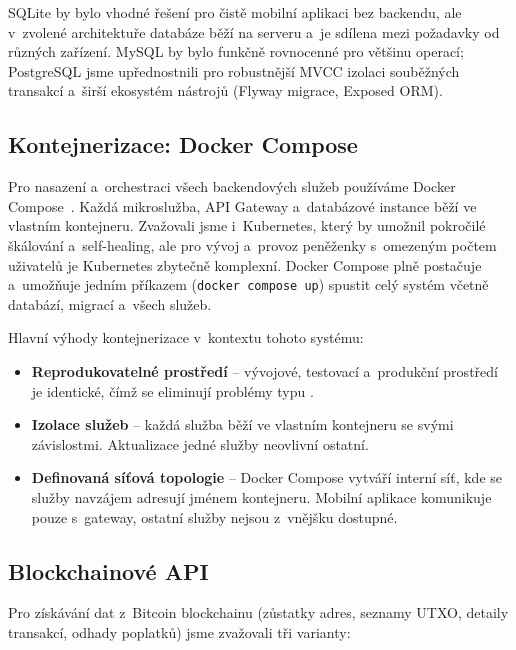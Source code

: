 SQLite by bylo vhodné řešení pro čistě mobilní aplikaci bez backendu, ale
v~zvolené architektuře databáze běží na serveru a~je sdílena mezi požadavky
od různých zařízení. MySQL by bylo funkčně rovnocenné pro většinu operací;
PostgreSQL jsme upřednostnili pro robustnější MVCC izolaci souběžných
transakcí a~širší ekosystém nástrojů (Flyway migrace, Exposed ORM).

\subsection{Kontejnerizace: Docker Compose}

Pro nasazení a~orchestraci všech backendových služeb používáme Docker
Compose~\cite{Docker}. Každá mikroslužba, API Gateway a~databázové instance
běží ve vlastním kontejneru. Zvažovali jsme i~Kubernetes, který by umožnil
pokročilé škálování a~self-healing, ale pro vývoj a~provoz peněženky
s~omezeným počtem uživatelů je Kubernetes zbytečně komplexní. Docker Compose
plně postačuje a~umožňuje jedním příkazem (\texttt{docker compose up})
spustit celý systém včetně databází, migrací a~všech služeb.

Hlavní výhody kontejnerizace v~kontextu tohoto systému:

\begin{itemize}
\item \textbf{Reprodukovatelné prostředí} -- vývojové, testovací a~produkční
  prostředí je identické, čímž se eliminují problémy typu .
\item \textbf{Izolace služeb} -- každá služba běží ve vlastním kontejneru
  se svými závislostmi. Aktualizace jedné služby neovlivní ostatní.
\item \textbf{Definovaná síťová topologie} -- Docker Compose vytváří interní
  síť, kde se služby navzájem adresují jménem kontejneru. Mobilní aplikace
  komunikuje pouze s~gateway, ostatní služby nejsou z~vnějšku dostupné.
\end{itemize}

\subsection{Blockchainové API}

Pro získávání dat z~Bitcoin blockchainu (zůstatky adres, seznamy UTXO,
detaily transakcí, odhady poplatků) jsme zvažovali tři varianty:


